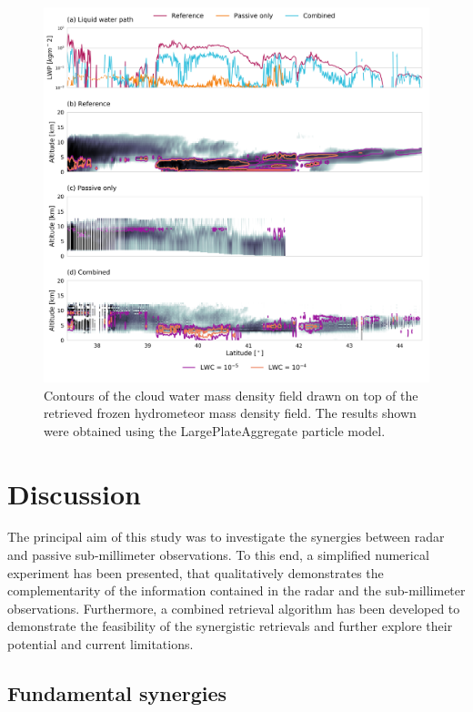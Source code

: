 \documentclass[journal abbreviation, manuscript]{copernicus}
\begin{document}
\begin{figure}
\centering
\includegraphics[width = \textwidth]{../plots/results_cw_b_LargePlateAggregate}
\caption{Contours of the cloud water mass density field drawn on top of the retrieved
  frozen hydrometeor mass density field. The results shown were obtained using the
  LargePlateAggregate particle model.}
\label{fig:results_cw_b}
\end{figure}


\section{Discussion}
\label{sec:discussion}

The principal aim of this study was to investigate the synergies between radar
and passive sub-millimeter observations. To this end, a simplified numerical
experiment has been presented, that qualitatively demonstrates the
complementarity of the information contained in the radar and the sub-millimeter
observations. Furthermore, a combined retrieval algorithm has been developed to
demonstrate the feasibility of the synergistic retrievals and further explore
their potential and current limitations.

\subsection{Fundamental synergies}
\end{document}
